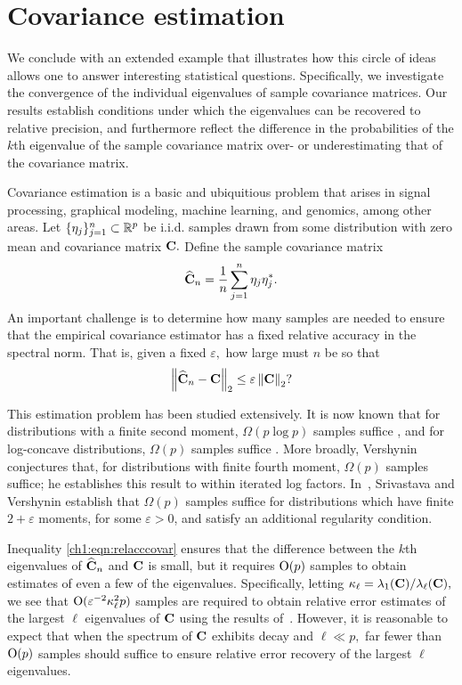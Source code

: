 \section{Covariance estimation}
\label{ch1:sec:covarianceest}

We conclude with an extended example that illustrates how this circle of ideas
allows one to answer interesting statistical questions. Specifically, we
investigate the convergence of the individual eigenvalues of sample covariance
matrices. Our results establish conditions under which the eigenvalues can be
recovered to relative precision, and furthermore reflect the difference in 
the probabilities of the $k$th eigenvalue of the sample covariance matrix
over- or underestimating that of the covariance matrix.

Covariance estimation is a basic and ubiquitious problem that arises in signal
processing, graphical modeling, machine learning, and genomics, among other
areas. Let $\{\mathbf{\eta}_j\}_{j=1}^n \subset \mathbb{R}^p$ be i.i.d. samples drawn from
some distribution with zero mean and covariance matrix $\mathbf{C}.$ Define the
sample covariance matrix 
\[
 \widehat{\mathbf{C}}_n = \frac{1}{n} \sum_{j=1}^n \mathbf{\eta}_j\mathbf{\eta}_j^*.
\]
An important challenge is to determine how many samples are needed to ensure
that the empirical covariance estimator has a fixed relative accuracy in the
spectral norm. That is, given a fixed $\varepsilon,$ how large must $n$ be so
that 
\begin{equation}
\label{ch1:eqn:relacccovar}
 \left\|\widehat{\mathbf{C}}_n - \mathbf{C}\right\|_2 \leq \varepsilon \left\|\mathbf{C}\right\|_2?
\end{equation}

This estimation problem has been studied extensively. It is now known that for
distributions with a finite second moment, $\Omega(p \log p)$ samples suffice
\cite{RU99}, and for log-concave distributions, $\Omega(p)$ samples suffice
\cite{ALPT10b}. More broadly, Vershynin \cite{V10} conjectures that, for
distributions with finite fourth moment, $\Omega(p)$ samples suffice; he
establishes this result to within iterated log factors. In~\cite{SV11}, Srivastava
and Vershynin establish that $\Omega(p)$ samples suffice for distributions
which have finite $2+\varepsilon$ moments, for some $\varepsilon >0$, and satisfy
an additional regularity condition.

Inequality \eqref{ch1:eqn:relacccovar} ensures that the difference between the
$k$th eigenvalues of $\widehat{\mathbf{C}}_n$ and $\mathbf{C}$ is small, but it
requires $\mathop{\text{O}}\!\left(p\right)$ samples to obtain estimates of even a few of the eigenvalues.
Specifically, letting $\kappa_\ell = \lambda_1(\mathbf{C})/\lambda_\ell(\mathbf{C}),$ 
we see that $\mathrm{O}(\varepsilon^{-2} \kappa_\ell^2 p)$ samples are required to obtain
relative error estimates of the largest $\ell$ eigenvalues of $\mathbf{C}$ using the 
results of~\cite{ALPT10b, V10, SV11}. However, it is reasonable to expect that
when the spectrum of $\mathbf{C}$ exhibits decay and $\ell \ll p,$ far fewer than
$\mathrm{O}(p)$ samples should suffice to ensure relative error recovery of the largest
$\ell$ eigenvalues. 

